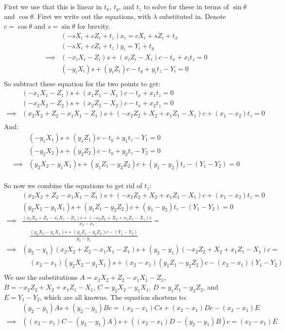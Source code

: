 \documentclass[11pt,english]{article}
\begin{document}
First we use that this is linear in $t_x$, $t_y$, and $t_z$ to solve for these in terms of $\sin\theta$ and 
$\cos\theta$. First we write out the equations, with $\lambda$ substituted in. Denote $c = \cos\theta$ and
$s = \sin\theta$ for brevity. 
\begin{align*}
& (-s X_i + c Z_i + t_z)x_i = c X_i + s Z_i + t_x \\
& (-s X_i + c Z_i + t_z)y_i = Y_i + t_y \\
\implies
& (-x_i X_i - Z_i) s + (x_i Z_i - X_i)c - t_x + x_i t_z = 0 \\
& (- y_i X_i)s + (y_i Z_i)c - t_y + y_i t_z - Y_i = 0 \\
\end{align*}
So subtract these equation for the two points to get:
\begin{align*}
& (-x_1 X_1 - Z_1) s + (x_1 Z_1 - X_1)c - t_x + x_1 t_z = 0 \\
& (-x_2 X_2 - Z_2) s + (x_2 Z_2 - X_2)c - t_x + x_2 t_z = 0 \\
\implies 
& (x_2 X_2 + Z_2-x_1 X_1 - Z_1) s + (-x_2 Z_2 + X_2 + x_1 Z_1 - X_1)c + (x_1-x_2) t_z = 0 \\
\end{align*}
And:
\begin{align*}
& (- y_1 X_1)s + (y_1 Z_1)c - t_y + y_1 t_z - Y_1 = 0 \\
& (- y_2 X_2)s + (y_2 Z_2)c - t_y + y_2 t_z - Y_2 = 0 \\
\implies 
& (y_2 X_2 - y_1 X_1)s + (y_1 Z_1- y_2 Z_2)c + (y_1 - y_2) t_z - (Y_1 - Y_2) = 0 \\
\end{align*}

So now we combine the equations to get rid of $t_z$:
\begin{align*}
& (x_2 X_2 + Z_2-x_1 X_1 - Z_1) s + (-x_2 Z_2 + X_2 + x_1 Z_1 - X_1)c + (x_1-x_2) t_z = 0 \\
& (y_2 X_2 - y_1 X_1)s + (y_1 Z_1- y_2 Z_2)c + (y_1 - y_2) t_z - (Y_1 - Y_2) = 0 \\
\implies
& \frac{(x_2 X_2 + Z_2-x_1 X_1 - Z_1) s + (-x_2 Z_2 + X_2 + x_1 Z_1 - X_1)c}{x_2-x_1} = \\
&\;\;\;\; \frac{(y_2 X_2 - y_1 X_1)s + (y_1 Z_1- y_2 Z_2)c - (Y_1 - Y_2)}{y_2 - y_1} \\
\implies
& (y_2 - y_1)(x_2 X_2 + Z_2-x_1 X_1 - Z_1) s + (y_2 - y_1)(-x_2 Z_2 + X_2 + x_1 Z_1 - X_1)c = \\
&\;\;\;\; (x_2-x_1)(y_2 X_2 - y_1 X_1)s + (x_2-x_1)(y_1 Z_1- y_2 Z_2)c - (x_2-x_1)(Y_1 - Y_2) \\
\end{align*}
We use the substitutions $A = x_2 X_2 + Z_2-x_1 X_1 - Z_1$, $B = -x_2 Z_2 + X_2 + x_1 Z_1 - X_1$,
$C = y_2 X_2 - y_1 X_1$, $D = y_1 Z_1- y_2 Z_2$, and $E = Y_1 - Y_2$, 
which are all knowns. The equation shortens to:
\begin{align*}
& (y_2 - y_1)A s + (y_2 - y_1)Bc = (x_2-x_1)Cs + (x_2-x_1)Dc - (x_2-x_1)E \\
\implies
& ((x_2-x_1)C-(y_2 - y_1)A) s + ((x_2-x_1)D-(y_2 - y_1)B)c = (x_2-x_1)E \\
\end{align*}
\end{document}
